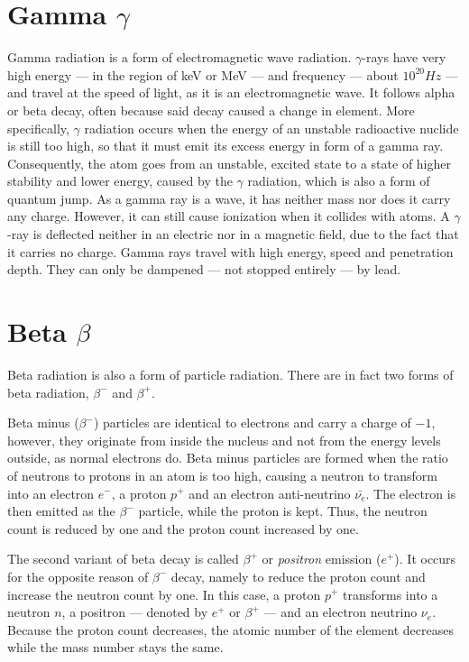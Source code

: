 \pagebreak

\section*{Gamma $\gamma$}

Gamma radiation is a form of electromagnetic wave radiation. $\gamma$-rays have very high energy --- in the region of keV or MeV --- and frequency --- about $10^{20} Hz$ --- and travel at the speed of light, as it is an electromagnetic wave. It follows alpha or beta decay, often because said decay caused a change in element. More specifically, $\gamma$ radiation occurs when the energy of an unstable radioactive nuclide is still too high, so that it must emit its excess energy in form of a gamma ray. Consequently, the atom goes from an unstable, excited state to a state of higher stability and lower energy, caused by the $\gamma$ radiation, which is also a form of quantum jump. As a gamma ray is a wave, it has neither mass nor does it carry any charge. However, it can still cause ionization when it collides with atoms. A $\gamma$-ray is deflected neither in an electric nor in a magnetic field, due to the fact that it carries no charge. Gamma rays travel with high energy, speed and penetration depth. They can only be dampened --- not stopped entirely --- by lead.

\section*{Beta $\beta$}

Beta radiation is also a form of particle radiation. There are in fact two forms of beta radiation, $\beta^-$ and $\beta^+$.

 Beta minus ($\beta^-$) particles are identical to electrons and carry a charge of $-1$, however, they originate from inside the nucleus and not from the energy levels outside, as normal electrons do. Beta minus particles are formed when the ratio of neutrons to protons in an atom is too high, causing a neutron to transform into an electron $e^-$, a proton $p^+$ and an electron anti-neutrino $\bar{\nu_{e}}$. The electron is then emitted as the $\beta^-$ particle, while the proton is kept. Thus, the neutron count is reduced by one and the proton count increased by one.

The second variant of beta decay is called $\beta^+$ or \emph{positron} emission ($e^+$). It occurs for the opposite reason of $\beta^-$ decay, namely to reduce the proton count and increase the neutron count by one. In this case, a proton $p^+$ transforms into a neutron $n$, a positron --- denoted by $e^+$ or $\beta^+$ --- and an electron neutrino $\nu_{e}$. Because the proton count decreases, the atomic number of the element decreases while the mass number stays the same.

